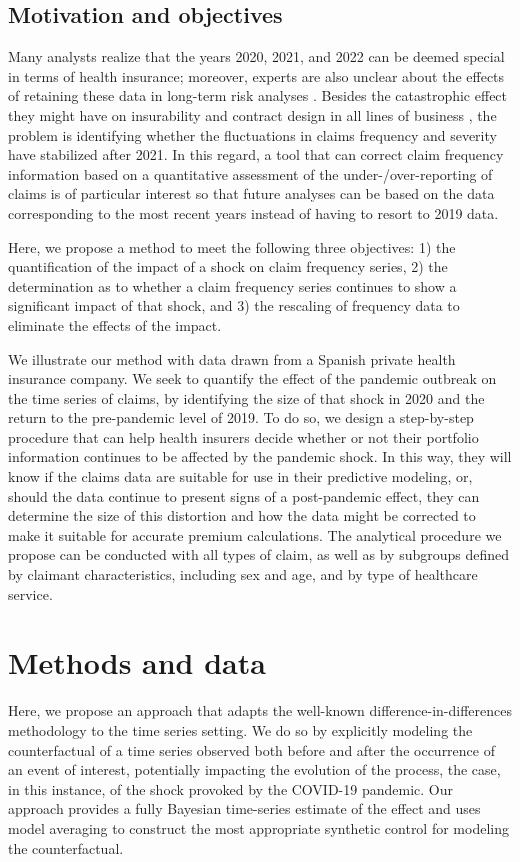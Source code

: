 \documentclass[]{risa}
\begin{document}
\subsection{Motivation and objectives}
Many analysts realize that the years 2020, 2021, and 2022 can be deemed special in terms of health insurance; moreover, experts are also  unclear about the effects of retaining these data in long-term risk analyses \cite{biancalana2022quantitative}. Besides the catastrophic effect they might have on insurability and contract design in all lines of business \cite{hartwig2020insurance}, the problem is identifying whether the fluctuations in claims frequency and severity have stabilized after 2021. In this regard, a tool that can correct claim frequency information based on a quantitative assessment of the under-/over-reporting of claims is of particular interest so that future analyses can be based on the data corresponding to the most recent years instead of having to resort to 2019 data.

Here, we propose a method to meet the following three objectives: 1) the quantification of the impact of a shock on claim frequency series, 2) the determination as to whether a claim frequency series continues to show a significant impact of that shock, and 3) the rescaling of frequency data to eliminate the effects of the impact.

We illustrate our method with data drawn from a Spanish private health insurance company. We seek to quantify the effect of the pandemic outbreak on the time series of claims, by identifying the size of that shock in 2020 and the return to the pre-pandemic level of 2019. To do so, we design a step-by-step procedure that can help health insurers decide whether or not their portfolio information continues to be affected by the pandemic shock. In this way, they will know if the claims data are suitable for use in their predictive modeling, or, should the data continue to present signs of a post-pandemic effect, they can determine the size of this distortion and how the data might be corrected to make it suitable for accurate premium calculations. The analytical procedure we propose can be conducted with all types of claim, as well as by subgroups defined by claimant characteristics, including sex and age, and by type of healthcare service.



\section{Methods and data}\label{methods}
Here, we propose an approach that adapts the well-known difference-in-differences methodology to the time series setting. We do so by explicitly modeling the counterfactual of a time series observed both before and after the occurrence of an event of interest, potentially impacting the evolution of the process, the case, in this instance, of the shock provoked by the COVID-19 pandemic. Our approach provides a fully Bayesian time-series estimate of the effect and uses model averaging to construct the most appropriate synthetic control for modeling the counterfactual.
\end{document}
